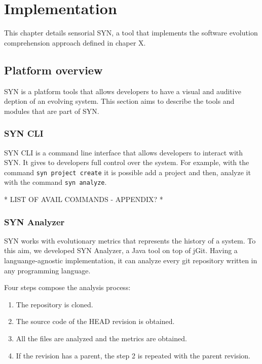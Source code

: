 
\chapter[Implementation]{Implementation}
\graphicspath{ {images/implementation} }
This chapter details sensorial SYN, a tool that implements the software evolution comprehension approach defined in chaper X. 


\section{Platform overview}

SYN is a platform tools that allows developers to have a visual and auditive deption of an evolving system. 
This section aims to describe the tools and modules that are part of SYN. 

\subsection{SYN CLI}
SYN CLI is a command line interface that allows developers to interact with SYN. It gives to developers full control over the system. 
For example, with the command \texttt{syn project create} it is possible add a project and then, analyze it with the command \texttt{syn analyze}. 

* LIST OF AVAIL COMMANDS - APPENDIX? *


\subsection{SYN Analyzer}

SYN works with evolutionary metrics that represents the history of a system. To this aim, we developed SYN Analyzer, a Java tool on top of jGit. 
Having a languange-agnostic implementation, it can analyze every git repository written in any programming language. 

Four steps compose the analysis process: 
    \begin{enumerate}
        \item The repository is cloned.
        \item The source code of the HEAD revision is obtained. 
        \item All the files are analyzed and the metrics are obtained.
        \item If the revision has a parent, the step 2 is repeated with the parent revision.
    \end{enumerate}

